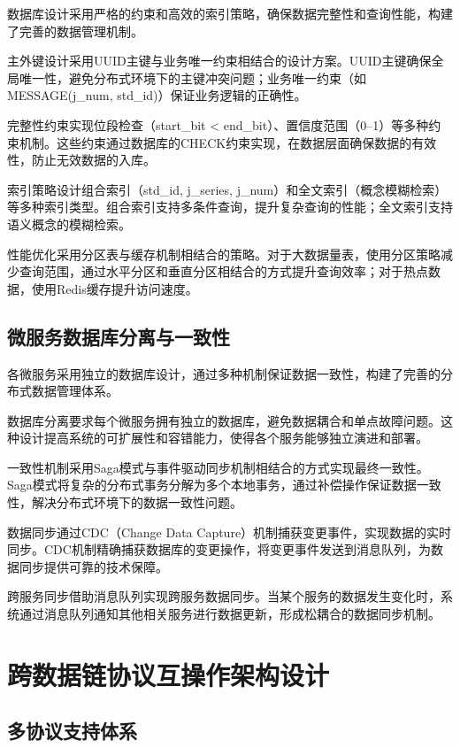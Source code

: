 数据库设计采用严格的约束和高效的索引策略，确保数据完整性和查询性能，构建了完善的数据管理机制。

主外键设计采用UUID主键与业务唯一约束相结合的设计方案。UUID主键确保全局唯一性，避免分布式环境下的主键冲突问题；业务唯一约束（如MESSAGE(j\_num, std\_id)）保证业务逻辑的正确性。

完整性约束实现位段检查（start\_bit < end\_bit）、置信度范围（0–1）等多种约束机制。这些约束通过数据库的CHECK约束实现，在数据层面确保数据的有效性，防止无效数据的入库。

索引策略设计组合索引（std\_id, j\_series, j\_num）和全文索引（概念模糊检索）等多种索引类型。组合索引支持多条件查询，提升复杂查询的性能；全文索引支持语义概念的模糊检索。

性能优化采用分区表与缓存机制相结合的策略。对于大数据量表，使用分区策略减少查询范围，通过水平分区和垂直分区相结合的方式提升查询效率；对于热点数据，使用Redis缓存提升访问速度。

\subsection{微服务数据库分离与一致性}

各微服务采用独立的数据库设计，通过多种机制保证数据一致性，构建了完善的分布式数据管理体系。

数据库分离要求每个微服务拥有独立的数据库，避免数据耦合和单点故障问题。这种设计提高系统的可扩展性和容错能力，使得各个服务能够独立演进和部署。

一致性机制采用Saga模式与事件驱动同步机制相结合的方式实现最终一致性。Saga模式将复杂的分布式事务分解为多个本地事务，通过补偿操作保证数据一致性，解决分布式环境下的数据一致性问题。

数据同步通过CDC（Change Data Capture）机制捕获变更事件，实现数据的实时同步。CDC机制精确捕获数据库的变更操作，将变更事件发送到消息队列，为数据同步提供可靠的技术保障。

跨服务同步借助消息队列实现跨服务数据同步。当某个服务的数据发生变化时，系统通过消息队列通知其他相关服务进行数据更新，形成松耦合的数据同步机制。

\section{跨数据链协议互操作架构设计}

\subsection{多协议支持体系}

